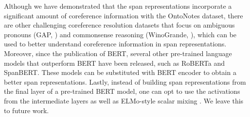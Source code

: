 \documentclass[11pt]{article}
\begin{document}
Although we have demonstrated that the span representations incorporate a significant amount of coreference information with the OntoNotes dataset, there are other challenging coreference resolution datasets that focus on ambiguous pronouns (GAP, \parencite{webster2018gap}) and commonsense reasoning (WinoGrande, \parencite{winogrande}), which can be used to better understand coreference information in span representations.
Moreover, since the publication of BERT, several other pre-trained language models that outperform BERT have been released, such as RoBERTa \parencite{roberta} and SpanBERT\parencite{spanbert}. These models can be substituted with BERT encoder to obtain a better span representations. Lastly, instead of building span representations from the final layer of a pre-trained BERT model, one can opt to use the activations from the intermediate layers as well as ELMo-style scalar mixing \parencite{tenney2019context,peters2018elmo}. We leave this to future work.


\printbibliography
\end{document}
